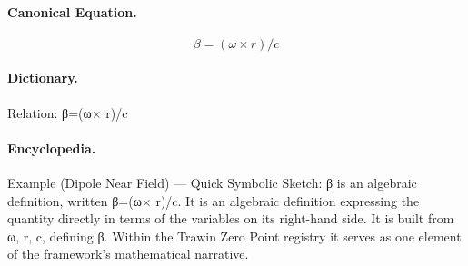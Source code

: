 \paragraph{Canonical Equation.}
\[
\beta=(\omega\times r)/c
\]

\paragraph{Dictionary.}
Relation: β=(ω× r)/c

\paragraph{Encyclopedia.}
Example (Dipole Near Field) — Quick Symbolic Sketch: β is an algebraic definition, written β=(ω× r)/c. It is an algebraic definition expressing the quantity directly in terms of the variables on its right-hand side. It is built from ω, r, c, defining β. Within the Trawin Zero Point registry it serves as one element of the framework's mathematical narrative.
